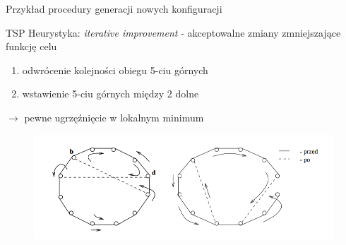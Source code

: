 	\begin{frame}{Przykład procedury generacji nowych konfiguracji}
		\begin{exampleblock}{TSP \cite{lin}}
			Heurystyka: \textit{iterative improvement} - akceptowalne zmiany zmniejszające funkcję celu
			\begin{enumerate}
				\item odwrócenie kolejności obiegu 5-ciu górnych
				\item wstawienie 5-ciu górnych między 2 dolne
			\end{enumerate}	
			$\rightarrow$ pewne ugrzęźnięcie w lokalnym minimum			
			\begin{figure}
				\includegraphics[height=0.4\textheight]{img/18/tsp}
			\end{figure}
		\end{exampleblock}
	\end{frame}